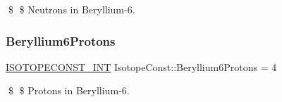 \$ \$ Neutrons in Beryllium-\/6. \mbox{\label{group___isotope_const-_beryllium-_be6_ga3ab3638132a9de026ff9634bc5d41199}} 
\subsubsection{\texorpdfstring{Beryllium6\+Protons}{Beryllium6Protons}}
{\footnotesize\ttfamily \mbox{\hyperlink{group___isotope_const-_macros_ga5f18360b3e99483a35c32d789e62621c}{I\+S\+O\+T\+O\+P\+E\+C\+O\+N\+S\+T\+\_\+\+I\+NT}} Isotope\+Const\+::\+Beryllium6\+Protons = 4}

\$ \$ Protons in Beryllium-\/6. 